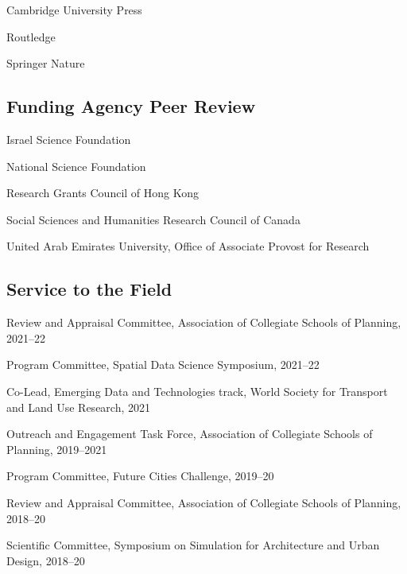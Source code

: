 \documentclass[11pt,letterpaper]{report}
\newcommand{\listitemspace}{0.25em}
\renewenvironment{itemize}
{\begin{list}{}{\setlength{\leftmargin}{0em}
                \setlength{\parskip}{0em}
                \setlength{\itemsep}{\listitemspace}
                \setlength{\parsep}{\listitemspace}}}
{\end{list}}
\begin{document}
    \begin{itemize}

        \item Cambridge University Press
        \item Routledge
        \item Springer Nature

    \end{itemize}

    \subsection*{Funding Agency Peer Review}

    \begin{itemize}

        \item Israel Science Foundation
        \item National Science Foundation
        \item Research Grants Council of Hong Kong
        \item Social Sciences and Humanities Research Council of Canada
        \item United Arab Emirates University, Office of Associate Provost for Research

    \end{itemize}

    \subsection*{Service to the Field}

    \begin{itemize}

        \item Review and Appraisal Committee, Association of Collegiate Schools of Planning, 2021--22
        \item Program Committee, Spatial Data Science Symposium, 2021--22
        \item Co-Lead, Emerging Data and Technologies track, World Society for Transport and Land Use Research, 2021
        \item Outreach and Engagement Task Force, Association of Collegiate Schools of Planning, 2019--2021
        \item Program Committee, Future Cities Challenge, 2019--20
        \item Review and Appraisal Committee, Association of Collegiate Schools of Planning, 2018--20
        \item Scientific Committee, Symposium on Simulation for Architecture and Urban Design, 2018--20

    \end{itemize}
\end{document}
